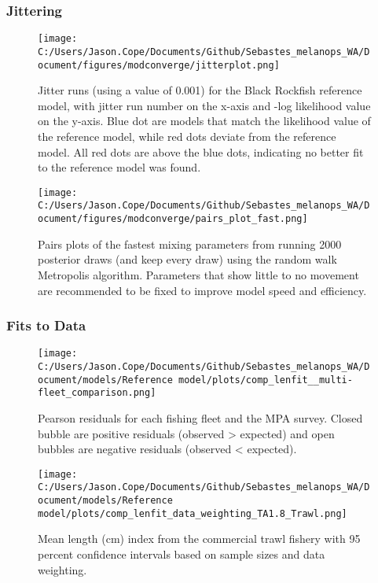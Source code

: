 \documentclass[11pt,
  letterpaper,
]{article}
\begin{document}
\hypertarget{jittering}{%
\subsubsection{Jittering}\label{jittering}}

\begin{figure}
{\centering
\texttt{[image: C:/Users/Jason.Cope/Documents/Github/Sebastes\_melanops\_WA/Document/figures/modconverge/jitterplot.png]}
}
\caption{Jitter runs (using a value of 0.001) for the Black Rockfish reference model, with jitter run number on the x-axis and -log likelihood value on the y-axis. Blue dot are models that match the likelihood value of the reference model, while red dots deviate from the reference model. All red dots are above the blue dots, indicating no better fit to the reference model was found.\label{fig:jitter}}
\end{figure}

\begin{figure}
{\centering
\texttt{[image: C:/Users/Jason.Cope/Documents/Github/Sebastes\_melanops\_WA/Document/figures/modconverge/pairs\_plot\_fast.png]}
}
\caption{Pairs plots of the fastest mixing parameters from running 2000 posterior draws (and keep every draw) using the random walk Metropolis algorithm. Parameters that show little to no movement are recommended to be fixed to improve model speed and efficiency.\label{fig:pairs_plot_fast}}
\end{figure}

\clearpage

\hypertarget{fits-to-data}{%
\subsubsection{Fits to Data}\label{fits-to-data}}

\begin{figure}
{\centering
\texttt{[image: C:/Users/Jason.Cope/Documents/Github/Sebastes\_melanops\_WA/Document/models/Reference model/plots/comp\_lenfit\_\_multi-fleet\_comparison.png]}
}
\caption{Pearson residuals for each fishing fleet and the MPA survey. Closed bubble are positive residuals (observed > expected) and open bubbles are negative residuals (observed < expected).\label{fig:lt-pearson-resids}}
\end{figure}

\pagebreak

\begin{figure}
{\centering
\texttt{[image: C:/Users/Jason.Cope/Documents/Github/Sebastes\_melanops\_WA/Document/models/Reference model/plots/comp\_lenfit\_data\_weighting\_TA1.8\_Trawl.png]}
}
\caption{Mean length (cm) index from the commercial trawl fishery with 95 percent confidence intervals based on sample sizes and data weighting.\label{fig:trawl-mean-len-fit}}
\end{figure}
\end{document}
